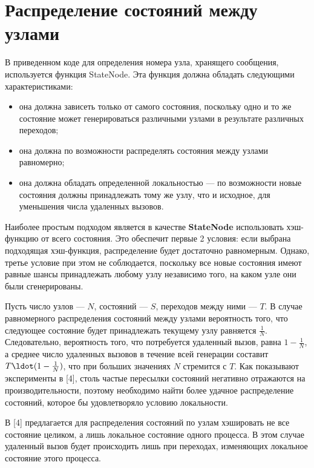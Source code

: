 \section{Распределение состояний между узлами}
\label{sec:state-partition}

В приведенном коде для определения номера узла, хранящего сообщения,
используется функция StateNode. Эта функция должна обладать следующими
характеристиками:

\begin{itemize}
\item она должна зависеть только от самого состояния, поскольку одно и
  то же состояние может генерироваться различными узлами в результате
  различных переходов;

\item она должна по возможности распределять состояния между узлами
  равномерно;

\item она должна обладать определенной локальностью — по возможности
  новые состояния должны принадлежать тому же узлу, что и исходное,
  для уменьшения числа удаленных вызовов.
\end{itemize}

Наиболее простым подходом является в качестве \textbf{StateNode} использовать
хэш-функцию от всего состояния. Это обеспечит первые 2 условия: если
выбрана подходящая хэш-функция, распределение будет достаточно
равномерным. Однако, третье условие при этом не соблюдается, поскольку
все новые состояния имеют равные шансы принадлежать любому узлу
независимо того, на каком узле они были сгенерированы.

Пусть число узлов — $N$, состояний — $S$, переходов между ними —
$T$. В случае равномерного распределения состояний между узлами
вероятность того, что следующее состояние будет принадлежать текущему
узлу равняется $\frac{1}{N}$. Следовательно, вероятность того, что
потребуется удаленный вызов, равна $1 - \frac{1}{N}$, а среднее число
удаленных вызовов в течение всей генерации составит $T \ldot (1 -
\frac{1}{N})$, что при больших значениях $N$ стремится с $T$. Как
показывают эксперименты в [4], столь частые пересылки состояний
негативно отражаются на производительности, поэтому необходимо найти
более удачное распределение состояний, которое бы удовлетворяло
условию локальности.

В [4] предлагается для распределения состояний по узлам хэшировать не
все состояние целиком, а лишь локальное состояние одного процесса. В
этом случае удаленный вызов будет происходить лишь при переходах,
изменяющих локальное состояние этого процесса.

